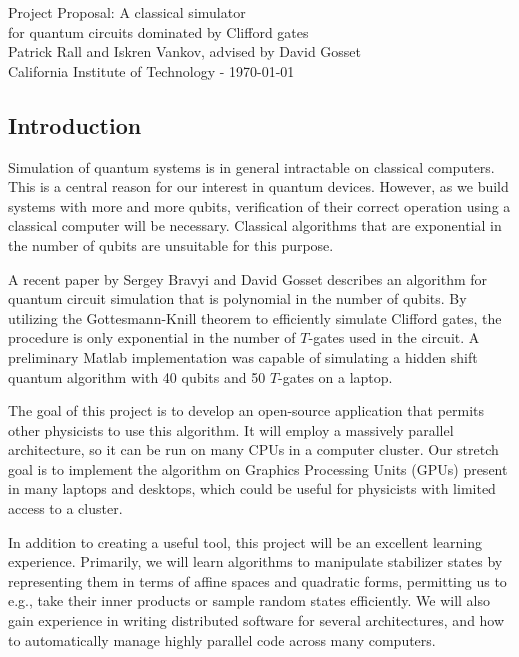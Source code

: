 \documentclass[11pt]{article}
\begin{document}
\begin{center}
    {\LARGE Project Proposal: A classical simulator\\ for quantum circuits dominated by Clifford gates }
\vspace{2mm}
{\large \\ Patrick Rall and Iskren Vankov, advised by David Gosset \\ California Institute of Technology -  \today}
\end{center}

\newenvironment{Figure}
  {\par\medskip\noindent\minipage{\linewidth}}
  {\endminipage\par\medskip}


\begin{multicols}{2}

\subsection*{Introduction}
Simulation of quantum systems is in general intractable on classical computers. This is a central reason for our interest in quantum devices. However, as we build systems with more and more qubits, verification of their correct operation using a classical computer will be necessary. Classical algorithms that are exponential in the number of qubits are unsuitable for this purpose.

A recent paper by Sergey Bravyi and David Gosset \cite{bravyi-gosset} describes an algorithm for quantum circuit simulation that is polynomial in the number of qubits. By utilizing the Gottesmann-Knill theorem to efficiently simulate Clifford gates, the procedure is only exponential in the number of $T$-gates used in the circuit. A preliminary Matlab implementation was capable of simulating a hidden shift quantum algorithm with 40 qubits and 50 $T$-gates on a laptop.

The goal of this project is to develop an open-source application that permits other physicists to use this algorithm. It will employ a massively parallel architecture, so it can be run on many CPUs in a computer cluster. Our stretch goal is to implement the algorithm on Graphics Processing Units (GPUs) present in many laptops and desktops, which could be useful for physicists with limited access to a cluster. 

In addition to creating a useful tool, this project will be an excellent learning experience.  Primarily, we will learn algorithms to manipulate stabilizer states by representing them in terms of affine spaces and quadratic forms, permitting us to e.g., take their inner products or sample random states efficiently. We will also gain experience in writing distributed software for several architectures, and how to automatically manage highly parallel code across many computers. 



\end{multicols}
\end{document}
